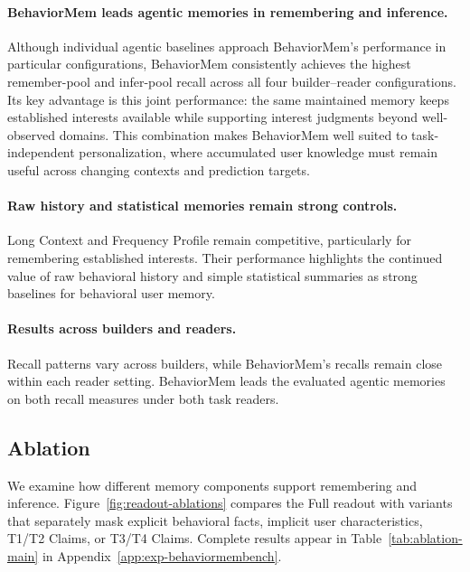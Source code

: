 \documentclass[sigconf,nonacm,balance=false]{acmart}
\begin{document}
\paragraph{\textbf{BehaviorMem leads agentic memories in remembering and inference.}}
Although individual agentic baselines approach BehaviorMem's performance in particular configurations, BehaviorMem consistently achieves the highest remember-pool and infer-pool recall across all four builder--reader configurations. Its key advantage is this joint performance: the same maintained memory keeps established interests available while supporting interest judgments beyond well-observed domains. This combination makes BehaviorMem well suited to task-independent personalization, where accumulated user knowledge must remain useful across changing contexts and prediction targets.

\paragraph{\textbf{Raw history and statistical memories remain strong controls.}}
Long Context and Frequency Profile remain competitive, particularly for remembering established interests. Their performance highlights the continued value of raw behavioral history and simple statistical summaries as strong baselines for behavioral user memory.



\paragraph{\textbf{Results across builders and readers.}}
Recall patterns vary across builders, while BehaviorMem's recalls remain close within each reader setting. BehaviorMem leads the evaluated agentic memories on both recall measures under both task readers.






\subsection{Ablation}
\label{sec:ablation}
We examine how different memory components support remembering and inference. Figure~\ref{fig:readout-ablations} compares the Full readout with variants that separately mask explicit behavioral facts, implicit user characteristics, T1/T2 Claims, or T3/T4 Claims. Complete results appear in Table~\ref{tab:ablation-main} in Appendix~\ref{app:exp-behaviormembench}.
\end{document}
